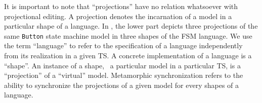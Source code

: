 It is important to note that ``projections'' have no relation whatsoever with projectional editing.
A projection denotes the incarnation of a model in a particular shape of a language.
In , the lower part depicts three projections of the same \texttt{Button} state machine model in three shapes of the FSM language.
We use the term ``language'' to refer to the specification of a language independently from its realization in a given TS.
A concrete implementation of a language is a ``shape''.
An instance of a shape, \ie~a particular model in a particular TS, is a ``projection'' of a ``virtual'' model.
Metamorphic synchronization refers to the ability to synchronize the projections of a given model for every shapes of a language.



